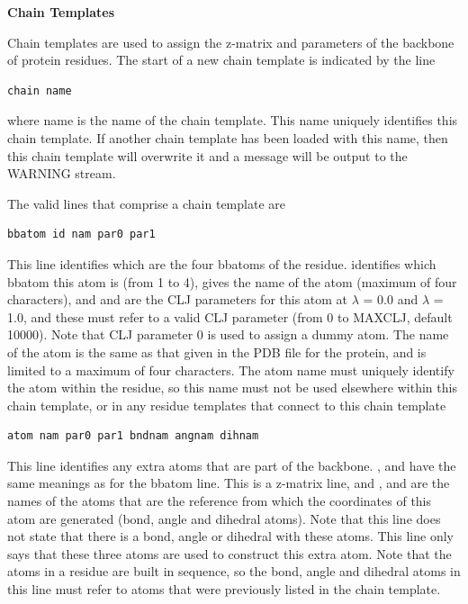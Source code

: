 \documentclass[letterpaper,10pt,english]{sphinxmanual}
\begin{document}
\textbf{Chain Templates}

Chain templates are used to assign the z-matrix and parameters of the backbone of protein residues. The start of a new chain template is indicated by the line

\begin{Verbatim}[commandchars=\\\{\}]
chain name
\end{Verbatim}

where name is the name of the chain template. This name uniquely identifies this chain template. If another chain template has been loaded with this name, then this chain template will overwrite it and a message will be output to the WARNING stream.

The valid lines that comprise a chain template are

\begin{Verbatim}[commandchars=\\\{\}]
bbatom id nam par0 par1
\end{Verbatim}

This line identifies which are the four bbatoms of the residue.  identifies which bbatom this atom is (from 1 to 4),  gives the name of the atom (maximum of four characters), and  and  are the CLJ parameters for this atom at \(\lambda\) = 0.0 and \(\lambda\) = 1.0, and these must refer to a valid CLJ parameter (from 0 to MAXCLJ, default 10000). Note that CLJ parameter 0 is used to assign a dummy atom. The name of the atom is the same as that given in the PDB file for the protein, and is limited to a maximum of four characters. The atom name must uniquely identify the atom within the residue, so this name must not be used elsewhere within this chain template, or in any residue templates that connect to this chain template

\begin{Verbatim}[commandchars=\\\{\}]
atom nam par0 par1 bndnam angnam dihnam
\end{Verbatim}

This line identifies any extra atoms that are part of the backbone. ,  and  have the same meanings as for the bbatom line. This is a z-matrix line, and ,  and  are the names of the atoms that are the reference from which the coordinates of this atom are generated (bond, angle and dihedral atoms). Note that this line does not state that there is a bond, angle or dihedral with these atoms. This line only says that these three atoms are used to construct this extra atom. Note that the atoms in a residue are built in sequence, so the bond, angle and dihedral atoms in this line must refer to atoms that were previously listed in the chain template.
\end{document}

